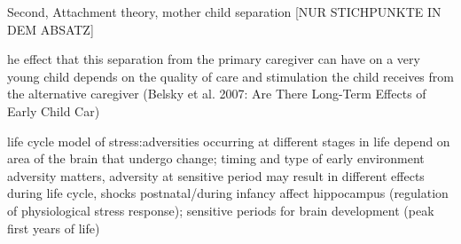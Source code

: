 \documentclass[11pt, a4paper]{article} %
\begin{document}
Second, Attachment theory, mother child separation [NUR STICHPUNKTE IN DEM ABSATZ]

he effect that this separation from the primary caregiver can have on a very young child depends on the quality
of care and stimulation the child receives from the alternative caregiver
(Belsky et al. 2007: Are There Long-Term Effects of Early Child Car)


\cite{raikkonen2012early} life cycle model of stress:adversities occurring at different stages in life depend on area of the brain that undergo change; timing and type of early environment adversity matters, adversity at sensitive period may result in different effects during life cycle, shocks postnatal/during infancy affect hippocampus (regulation of physiological stress response); sensitive periods for brain development (peak first years of life)
\newline
\end{document}
